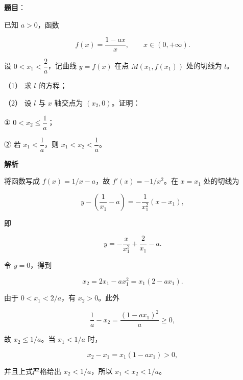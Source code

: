 \begin{answer}

\textbf{题目}：

已知 $a>0$，函数

\nopagebreak[4]
\[
f(x)=\frac{1-ax}{x},\qquad x\in(0,+\infty).
\]

设 $0<x_1<\dfrac2a$，记曲线 $y=f(x)$ 在点 $M(x_1,f(x_1))$ 处的切线为 $l$。

（1） 求 $l$ 的方程；

（2） 设 $l$ 与 $x$ 轴交点为 $(x_2,0)$。证明：

① $0<x_2\leqslant\dfrac1a$；

② 若 $x_1<\dfrac1a$，则 $x_1<x_2<\dfrac1a$。

\textbf{解析}


将函数写成 $f(x)=1/x-a$，故 $f'(x)=-1/x^2$。在 $x=x_1$ 处的切线为

\nopagebreak[4]
\[
y-\left(\frac1{x_1}-a\right)
=-\frac1{x_1^2}(x-x_1),
\]

即

\nopagebreak[4]
\[
y=-\frac{x}{x_1^2}+\frac2{x_1}-a.
\]


令 $y=0$，得到

\nopagebreak[4]
\[
x_2=2x_1-ax_1^2=x_1(2-ax_1).
\]

由于 $0<x_1<2/a$，有 $x_2>0$。此外

\nopagebreak[4]
\[
\frac1a-x_2
=\frac{(1-ax_1)^2}{a}\geqslant0,
\]

故 $x_2\leqslant1/a$。当 $x_1<1/a$ 时，

\nopagebreak[4]
\[
x_2-x_1=x_1(1-ax_1)>0,
\]

并且上式严格给出 $x_2<1/a$，所以 $x_1<x_2<1/a$。



\end{answer}
